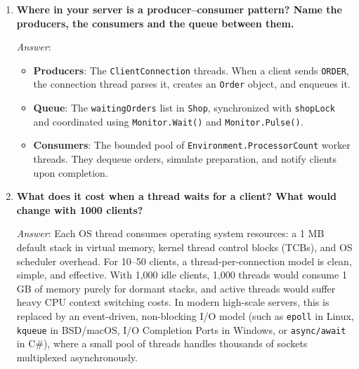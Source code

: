 \documentclass[11pt,a4paper]{article}
\begin{document}
\begin{enumerate}[label=\textbf{Control Q\arabic*.},leftmargin=*]
    \textit{Answer}:
    \begin{itemize}
        \item \textbf{Returns 0}: Indicates an orderly, graceful TCP shutdown. The remote peer initiated a four-way handshake by sending a \texttt{FIN} packet. No more data will arrive on this stream.
        \item \textbf{Connection reset (\texttt{WSAECONNRESET} / \texttt{ECONNRESET})}: Indicates an ungraceful, abortive termination. The peer sent an \texttt{RST} packet (e.g., process crashed, killed via Task Manager / SIGKILL, or tried to send data on a half-closed socket). The socket is dead and must be closed.
    \end{itemize}

    \item \textbf{Where in your server is a producer--consumer pattern? Name the producers, the consumers and the queue between them.}
    
    \textit{Answer}:
    \begin{itemize}
        \item \textbf{Producers}: The \texttt{ClientConnection} threads. When a client sends \texttt{ORDER}, the connection thread parses it, creates an \texttt{Order} object, and enqueues it.
        \item \textbf{Queue}: The \texttt{waitingOrders} list in \texttt{Shop}, synchronized with \texttt{shopLock} and coordinated using \texttt{Monitor.Wait()} and \texttt{Monitor.Pulse()}.
        \item \textbf{Consumers}: The bounded pool of \texttt{Environment.ProcessorCount} worker threads. They dequeue orders, simulate preparation, and notify clients upon completion.
    \end{itemize}

    \item \textbf{What does it cost when a thread waits for a client? What would change with 1000 clients?}
    
    \textit{Answer}: Each OS thread consumes operating system resources: a 1 MB default stack in virtual memory, kernel thread control blocks (TCBs), and OS scheduler overhead. For 10--50 clients, a thread-per-connection model is clean, simple, and effective.
    With 1,000 idle clients, 1,000 threads would consume 1 GB of memory purely for dormant stacks, and active threads would suffer heavy CPU context switching costs. In modern high-scale servers, this is replaced by an event-driven, non-blocking I/O model (such as \texttt{epoll} in Linux, \texttt{kqueue} in BSD/macOS, I/O Completion Ports in Windows, or \texttt{async/await} in C\#), where a small pool of threads handles thousands of sockets multiplexed asynchronously.


\end{enumerate}
\end{document}
